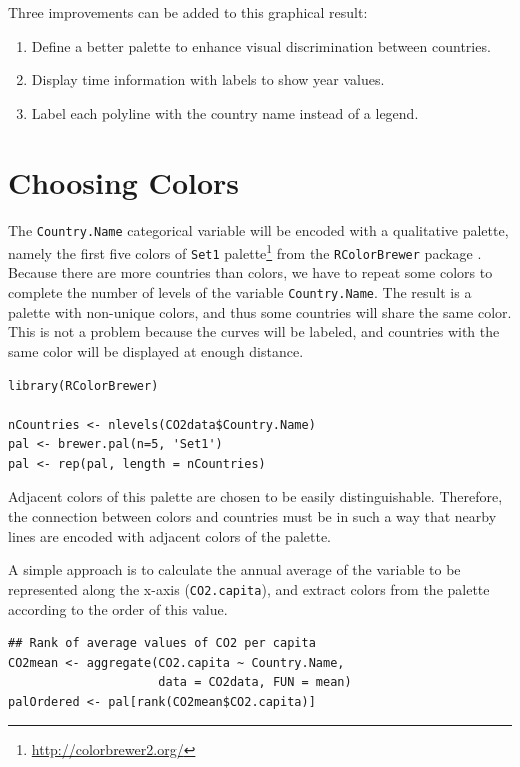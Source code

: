 \documentclass[smallroyalvopaper]{memoir}
\begin{document}
Three improvements can be added to this graphical result: 
\begin{enumerate}
\item Define a better palette to enhance visual discrimination between
countries.
\item Display time information with labels to show year values.
\item Label each polyline with the country name instead of a legend.
\end{enumerate}

\section{Choosing Colors}
\label{sec:org10e7bff}
The \texttt{Country.Name} categorical variable will be encoded with a
qualitative palette, namely the first five colors of \texttt{Set1}
palette\footnote{\url{http://colorbrewer2.org/}} from the \texttt{RColorBrewer} package
\cite{Neuwirth2011}. Because there are more countries than colors, we
have to repeat some colors to complete the number of levels of the
variable \texttt{Country.Name}. The result is a palette with non-unique
colors, and thus some countries will share the same color. This is not
a problem because the curves will be labeled, and countries with the
same color will be displayed at enough distance.


\lstset{language=r,label= ,caption= ,captionpos=b,numbers=none}
\begin{lstlisting}
library(RColorBrewer)

nCountries <- nlevels(CO2data$Country.Name)
pal <- brewer.pal(n=5, 'Set1')
pal <- rep(pal, length = nCountries)
\end{lstlisting}

Adjacent colors of this palette are chosen to be easily
distinguishable. Therefore, the connection between colors and
countries must be in such a way that nearby lines are encoded
with adjacent colors of the palette.

A simple approach is to calculate the annual average of the
variable to be represented along the x-axis (\texttt{CO2.capita}), and
extract colors from the palette according to the order of this
value.  


\lstset{language=r,label= ,caption= ,captionpos=b,numbers=none}
\begin{lstlisting}
## Rank of average values of CO2 per capita
CO2mean <- aggregate(CO2.capita ~ Country.Name,
                     data = CO2data, FUN = mean)
palOrdered <- pal[rank(CO2mean$CO2.capita)]  
\end{lstlisting}
\end{document}
